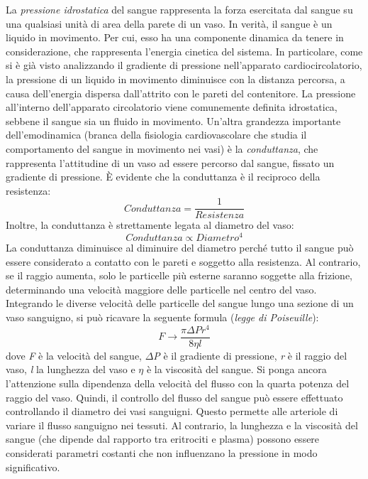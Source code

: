 La \textit{pressione idrostatica} del sangue rappresenta la forza esercitata dal sangue su una qualsiasi unità di area della parete di un vaso. In verità, il sangue è un liquido in movimento. Per cui, esso ha una componente dinamica da tenere in considerazione, che rappresenta l'energia cinetica del sistema. In particolare, come si è già visto analizzando il gradiente di pressione nell'apparato cardiocircolatorio, la pressione di un liquido in movimento diminuisce con la distanza percorsa, a causa dell'energia dispersa dall'attrito con le pareti del contenitore. La pressione all'interno dell'apparato circolatorio viene comunemente definita idrostatica, sebbene il sangue sia un fluido in movimento. Un'altra grandezza importante dell'emodinamica (branca della fisiologia cardiovascolare che studia il comportamento del sangue in movimento nei vasi) è la \textit{conduttanza}, che rappresenta l'attitudine di un vaso ad essere percorso dal sangue, fissato un gradiente di pressione. \`E evidente che la conduttanza è il reciproco della resistenza: 
\begin{equation}
	Conduttanza=\frac{1}{Resistenza}
	\label{eq:Conduttanza}
\end{equation}
Inoltre, la conduttanza è strettamente legata al diametro del vaso: 
\begin{equation}
	Conduttanza\propto Diametro^4
	\label{eq:ConduttanzaeDiametro}
\end{equation}
La conduttanza diminuisce al diminuire del diametro perché tutto il sangue può essere considerato a contatto con le pareti e soggetto alla resistenza. Al contrario, se il raggio aumenta, solo le particelle più esterne saranno soggette alla frizione, determinando una velocità maggiore delle particelle nel centro del vaso.
Integrando le diverse velocità delle particelle del sangue lungo una sezione di un vaso sanguigno, si può ricavare la seguente formula (\textit{legge di Poiseuille}):
\begin{equation}
	F\xrightarrow{}\frac{\pi\Delta P r^4}{8 \eta l}
	\label{eq:PoiseuuilleLaw}
\end{equation}
dove \textit{F} è la velocità del sangue, \textit{$\Delta$P} è il gradiente di pressione, \textit{r} è il raggio del vaso, \textit{l} la lunghezza del vaso e \textit{$\eta$} è la viscosità del sangue. Si ponga ancora l'attenzione sulla dipendenza della velocità del flusso con la quarta potenza del raggio del vaso. Quindi, il controllo del flusso del sangue può essere effettuato controllando il diametro dei vasi sanguigni. Questo permette alle arteriole di variare il flusso sanguigno nei tessuti. Al contrario, la lunghezza e la viscosità del sangue (che dipende dal rapporto tra eritrociti e plasma) possono essere considerati parametri costanti che non influenzano la pressione in modo significativo.

